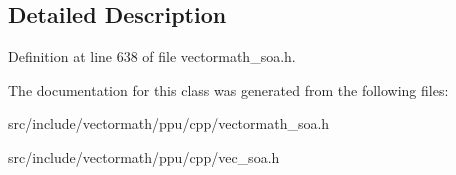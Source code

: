 \subsection{Detailed Description}


Definition at line 638 of file vectormath\-\_\-soa.\-h.



The documentation for this class was generated from the following files\-:\begin{DoxyCompactItemize}
\item 
src/include/vectormath/ppu/cpp/vectormath\-\_\-soa.\-h\item 
src/include/vectormath/ppu/cpp/vec\-\_\-soa.\-h\end{DoxyCompactItemize}
